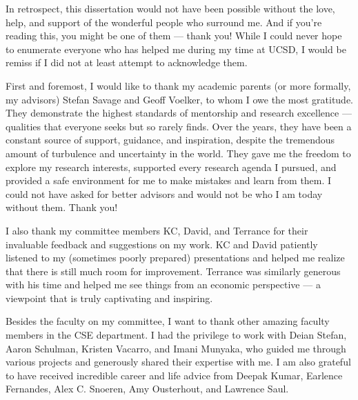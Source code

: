 \begin{acknowledgements}
In retrospect, this dissertation would not have been possible without the love, help,  and support of the wonderful people who surround me. And if you're reading this, you might be one of them --- thank you!
While I could never hope to enumerate everyone who has helped me during my time at UCSD, I would be remiss if I did not at least attempt to acknowledge them. 


First and foremost, I would like to thank my academic parents (or more formally, my advisors) Stefan Savage and Geoff Voelker,
to whom I owe the most gratitude. They demonstrate the highest standards of mentorship and research excellence --- qualities that everyone seeks but so rarely finds.
Over the years, they have been a constant source of support, guidance, and inspiration, despite the tremendous amount of turbulence and uncertainty in the world. They gave me the freedom to explore my research interests, supported every research agenda I pursued, and provided a safe environment for me to make mistakes and learn from them. I could not have asked for better advisors and would not be who I am today without them. Thank you!


I also thank my committee members KC, David, and Terrance
for their invaluable feedback and suggestions on my work. KC and David patiently listened to my (sometimes poorly prepared) presentations and helped me realize that there is still much room for improvement. Terrance was similarly generous with his time and helped me see things from an economic perspective --- a viewpoint that is truly captivating and inspiring.

Besides the faculty on my committee, I want to thank other amazing faculty members in the CSE department. I had the privilege to work with Deian Stefan, Aaron Schulman, Kristen Vacarro, and Imani Munyaka, who guided me through various projects and generously shared their expertise with me. I am also grateful to have received incredible career and life advice from Deepak Kumar, Earlence Fernandes, Alex C. Snoeren, Amy Ousterhout, and Lawrence Saul.


\end{acknowledgements}
